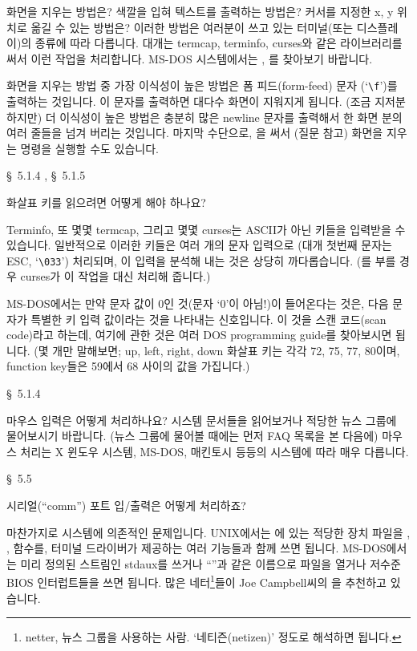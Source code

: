 \begin{faq}
	화면을 지우는 방법은?
	색깔을 입혀 텍스트를 출력하는 방법은?
	커서를 지정한 x, y 위치로 옮길 수 있는 방법은?
\A
	이러한 방법은 여러분이 쓰고 있는 터미널(또는 디스플레이)의 종류에
	따라 다릅니다.  대개는 termcap, terminfo, curses와 같은 라이브러리를
	써서 이런 작업을 처리합니다.  MS-DOS 시스템에서는 
	, 를 찾아보기 바랍니다.

	화면을 지우는 방법 중 가장 이식성이 높은 방법은 폼 피드(form-feed)
	문자 (`\verb+\f+')를 출력하는 것입니다.  이 문자를 출력하면
	대다수 화면이 지워지게 됩니다.  (조금 지저분하지만) 더 이식성이
	높은 방법은 충분히 많은 newline 문자를 출력해서 한 화면 분의
	여러 줄들을 넘겨 버리는 것입니다.
	마지막 수단으로, 을 써서 (질문  참고)
	화면을 지우는 명령을 실행할 수도 있습니다.

\R
	\cite{pcs} \S\ 5.1.4 , \S\ 5.1.5 
\end{faq}

\begin{faq}
	화살표 키를 읽으려면 어떻게 해야 하나요?

\A
	Terminfo, 또 몇몇 termcap, 그리고 몇몇 curses는 ASCII가 아닌
	키들을 입력받을 수 있습니다.  일반적으로 이러한 키들은
	여러 개의 문자 입력으로 (대개 첫번째 문자는 ESC, `\verb+\033+')
	처리되며, 이 입력을 분석해 내는 것은 상당히 까다롭습니다.
	(를 부를 경우 curses가 이 작업을 대신 처리해 줍니다.)

	MS-DOS에서는 만약 문자 값이 0인 것(문자 `0'이 아님!)이 들어온다는
	것은, 다음 문자가 특별한 키 입력 값이라는 것을 나타내는
	신호입니다.  이 것을 스캔 코드(scan code)라고 하는데,
	여기에 관한 것은 여러 DOS programming guide를 찾아보시면 됩니다.
	(몇 개만 말해보면; up, left, right, down 화살표 키는 각각
	72, 75, 77, 80이며, function key들은 59에서 68 사이의 값을
	가집니다.)

\R
	\cite{pcs} \S\ 5.1.4 
\end{faq}

\begin{faq}
	마우스 입력은 어떻게 처리하나요?
\A
	시스템 문서들을 읽어보거나 적당한 뉴스 그룹에 물어보시기 바랍니다.
	(뉴스 그룹에 물어볼 때에는 먼저 FAQ 목록을 본 다음에)
	마우스 처리는 X 윈도우 시스템, MS-DOS, 매킨토시 등등의 시스템에
	따라 매우 다릅니다.

\R
	\cite{pcs} \S\ 5.5 
\end{faq}

\begin{faq}
	시리얼(``comm'') 포트 입/출력은 어떻게 처리하죠?

\A
	마찬가지로 시스템에 의존적인 문제입니다.  UNIX에서는
	에 있는 적당한 장치 파일을 , , 
	함수를, 터미널 드라이버가 제공하는 여러 기능들과 함께 쓰면 됩니다.
	MS-DOS에서는 미리 정의된 스트림인 stdaux를 쓰거나 ``''과
	같은 이름으로 파일을 열거나 저수준 BIOS 인터럽트들을 쓰면 됩니다.
	많은 네터\footnote{netter, 뉴스 그룹을 사용하는 사람.  `네티즌(netizen)'
	정도로 해석하면 됩니다.}들이 Joe Campbell씨의
	을 추천하고 있습니다.
\end{faq}

